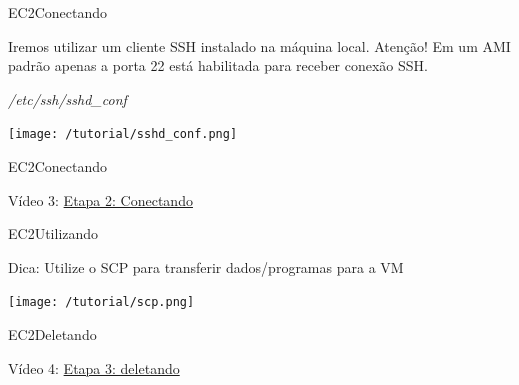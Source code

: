 \documentclass[xcolor=table]{beamer}
\begin{document}
\begin{frame}[c]{EC2}{Conectando}
        \begin{center}
            \begin{outline}                
                \1 Iremos utilizar um cliente SSH instalado na máquina local.
                \1 Atenção! Em um AMI padrão apenas a porta 22 está habilitada para receber conexão SSH.
            \end{outline}
        \end{center}
        \begin{center}
        
            \textit{/etc/ssh/sshd\_conf}
            
            \texttt{[image: /tutorial/sshd\_conf.png]}
        \end{center}

\end{frame}


\begin{frame}[c]{EC2}{Conectando}

        \begin{center}
            Vídeo 3: \href{run:./3_connecting.ogv}{Etapa 2: Conectando}
        \end{center}
      
\end{frame}



\begin{frame}[c]{EC2}{Utilizando}


        \begin{center}
            

            \begin{outline}
                \1[] Dica:
                \2[] Utilize o SCP para transferir dados/programas para a VM 
            \end{outline}
            \vspace{0.5cm}
            \texttt{[image: /tutorial/scp.png]}
            
        \end{center}      
\end{frame}


\begin{frame}[c]{EC2}{Deletando}

        \begin{center}
            Vídeo 4: \href{run:./4_encerrando.ogv}{Etapa 3: deletando}
        \end{center}
      
\end{frame}
\end{document}
